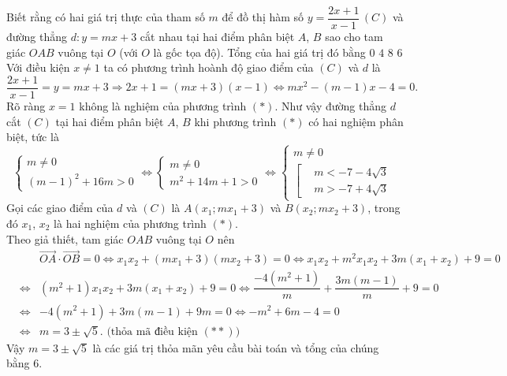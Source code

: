 \begin{ex}%
 Biết rằng có hai giá trị thực của tham số $m$ để đồ thị hàm số $y=\dfrac{2x+1}{x-1}\,(C)$ và đường thẳng $d\colon y=mx+3$ cắt nhau tại hai điểm phân biệt $A$, $B$ sao cho tam giác $OAB$ vuông tại $O$ (với $O$ là gốc tọa độ). Tổng của hai giá trị đó bằng
 \choice
  {$0$}
  {$4$}
  {$8$}
  {\True $6$}
 \loigiai
  {
  Với điều kiện $x \neq 1$ ta có phương trình hoành độ giao điểm của $(C)$ và $d$ là
  \begin{equation*}
   \dfrac{2x+1}{x-1} = y=mx+3 \Rightarrow 2x+1 = (mx+3)(x-1) \Leftrightarrow mx^2 - (m-1)x - 4 = 0. \tag{$*$}
  \end{equation*}
  Rõ ràng $x=1$ không là nghiệm của phương trình $(*)$. Như vậy đường thẳng $d$ cắt $(C)$ tại hai điểm phân biệt $A$, $B$ khi phương trình $(*)$ có hai nghiệm phân biệt, tức là
  \begin{equation}
   \begin{cases} m \neq 0 \\ (m-1)^2 + 16m > 0 \end{cases} \Leftrightarrow \begin{cases} m \neq 0 \\ m^2 + 14m + 1 > 0 \end{cases} \Leftrightarrow \begin{cases} m \neq 0 \\ \left[\begin{aligned} & m<-7-4\sqrt{3} \\& m>-7+4\sqrt{3}\end{aligned}\right. \end{cases} \tag{$**$}
  \end{equation}
  Gọi các giao điểm của $d$ và $(C)$ là $A(x_1;mx_1+3)$ và $B(x_2;mx_2+3)$, trong đó $x_1$, $x_2$ là hai nghiệm của phương trình $(*)$.\\
  Theo giả thiết, tam giác $OAB$ vuông tại $O$ nên
  \begin{eqnarray*}
   & & \overrightarrow{OA} \cdot \overrightarrow{OB} = 0 \Leftrightarrow x_1x_2 + (mx_1+3)(mx_2+3)=0 \Leftrightarrow x_1x_2 + m^2x_1x_2 + 3m(x_1+x_2) + 9 = 0\\
   &\Leftrightarrow & (m^2+1)x_1x_2 + 3m(x_1+x_2)+9=0 \Leftrightarrow \dfrac{-4(m^2+1)}{m} + \dfrac{3m(m-1)}{m} + 9 = 0 \\
   &\Leftrightarrow & -4(m^2+1) + 3m(m-1) + 9m = 0 \Leftrightarrow -m^2 + 6m - 4 = 0\\
   &\Leftrightarrow & m = 3 \pm \sqrt{5}. \text{ (thỏa mã điều kiện $(**)$)}
  \end{eqnarray*}
  Vậy $m = 3 \pm \sqrt{5}$ là các giá trị thỏa mãn yêu cầu bài toán và tổng của chúng bằng $6$.
  }
\end{ex}


